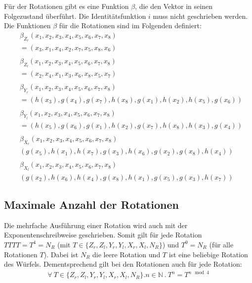 \documentclass[12pt,a4paper, usenames, dvipsnames]{article}
\theoremstyle{mystyle}
\theoremstyle{definition}
\begin{document}
Für der Rotationen gibt es eine Funktion $\beta$, die den Vektor in seinen Folgezustand überführt. Die Identitätsfunktion $i$ muss nicht geschrieben werden. Die Funktionen $\beta$ für die Rotationen sind im Folgenden definiert:
\begin{align*}
 & \beta_{Z_r}(x_1, x_2, x_3, x_4, x_5,x_6,x_7,x_8) \\
 & = (x_3, x_1, x_4, x_2, x_7, x_5, x_8, x_6) \\
\\
 & \beta_{Z_l}(x_1, x_2, x_3, x_4, x_5,x_6,x_7,x_8) \\
 & = (x_2, x_4, x_1, x_3, x_6, x_8, x_5, x_7) \\
\\
 & \beta_{Y_r}(x_1, x_2, x_3, x_4, x_5,x_6,x_7,x_8) \\
 & = (h(x_3), g(x_4), g(x_7), h(x_8), g(x_1), h(x_2), h(x_5), g(x_6)) \\
\\
 & \beta_{Y_l}(x_1, x_2, x_3, x_4, x_5,x_6,x_7,x_8) \\
 & = (h(x_5), g(x_6), g(x_1), h(x_2),g(x_7),h(x_8),h(x_3),g(x_4)) \\
\\
 & \beta_{X_r}(x_1, x_2, x_3, x_4, x_5,x_6,x_7,x_8) \\
 & (g(x_5), h(x_1), h(x_7), g(x_3), h(x_6), g(x_2), g(x_8),h(x_4)) \\
\\
 & \beta_{X_l}(x_1, x_2, x_3, x_4, x_5,x_6,x_7,x_8) \\
 & (g(x_2), h(x_6), h(x_4),g(x_8), h(x_1), g(x_5), g(x_3), h(x_7)) 
\end{align*}



%
%
%
%
%
%
%
%
%
%
%
%
%
%
%
%
%
%
%

\subsection{Maximale Anzahl der Rotationen}
\label{Abschnitt_MaxAnzahlRotationen}

Die mehrfache Ausführung einer Rotation wird auch mit der Exponentenschreibweise geschrieben. 
Somit gilt für jede Rotation $TTTT=T^4=N_R$ (mit $T \in \{{Z_r}, {Z_l}, {Y_r}, {Y_l}, {X_r}, {X_l} , N_R \}$) und $T^0=N_R$ (für alle Rotationen $T$). Dabei ist $N_R$ die leere Rotation und $T$ ist eine beliebige Rotation des Würfels. 
Dementsprechend gilt bei den Rotationen auch für jede Rotation: 
\begin{align*}
\forall \ T \in \{{Z_r}, {Z_l}, {Y_r}, {Y_l}, {X_r}, {X_l}, N_R \}. n \in \mathbb{N} \ . \ T^n=T^{n \mod 4}
\end{align*}
\end{document}
